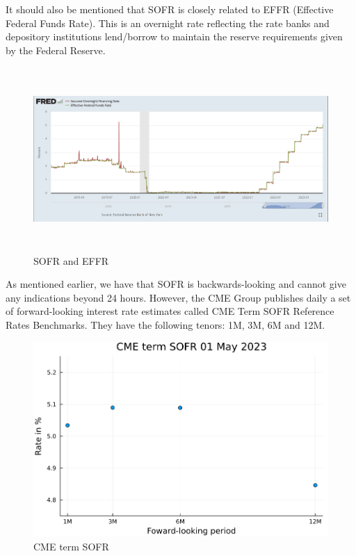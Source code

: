 \newpage 

It should also be mentioned that SOFR is closely related to EFFR (Effective Federal Funds Rate). This is an overnight rate reflecting the rate banks and depository institutions lend/borrow to maintain the reserve requirements given by the Federal Reserve.

\begin{figure}[htp]
    \centering
    \includegraphics[height = 7cm, width=15cm]{figures/SOFR/SOFR_EFFR.PNG}
    \caption{SOFR and EFFR}
    \label{fig: SOFR_EFFR}
\end{figure}


As mentioned earlier, we have that SOFR is backwards-looking and cannot give any indications beyond 24 hours. However, the CME Group publishes daily a set of forward-looking interest rate estimates called CME Term SOFR Reference Rates Benchmarks. 
They have the following tenors: 1M, 3M, 6M and 12M. 


\begin{figure}[htp]
    \centering
    \includegraphics[width=12cm]{figures/SOFR/CME_term_SOFR.PNG}
    \caption{CME term SOFR }
    \label{fig: CME_term_SOFR}
\end{figure}



